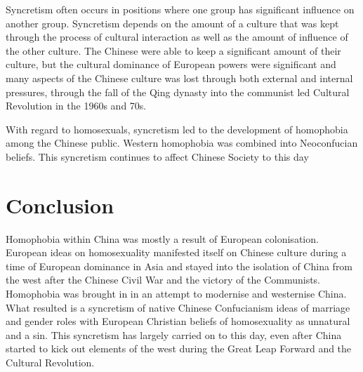 Syncretism often occurs in positions where one group has significant influence on another group. Syncretism depends on the amount of a culture that was kept through the process of cultural interaction as well as the amount of influence of the other culture. The Chinese were able to keep a significant amount of their culture, but the cultural dominance of European powers were significant and many aspects of the Chinese culture was lost through both external and internal pressures, through the fall of the Qing dynasty into the communist led Cultural Revolution in the 1960s and 70s.

With regard to homosexuals, syncretism led to the development of homophobia among the Chinese public. Western homophobia was combined into Neoconfucian beliefs. This syncretism continues to affect Chinese Society to this day

\newpage
\section{Conclusion}

Homophobia within China was mostly a result of European colonisation. European ideas on homosexuality manifested itself on Chinese culture during a time of European dominance in Asia and stayed into the isolation of China from the west after the Chinese Civil War and the victory of the Communists. Homophobia was brought in in an attempt to modernise and westernise China. What resulted is a syncretism of native Chinese Confucianism ideas of marriage and gender roles with European Christian beliefs of homosexuality as unnatural and a sin. This syncretism has largely carried on to this day, even after China started to kick out elements of the west during the Great Leap Forward and the Cultural Revolution.
